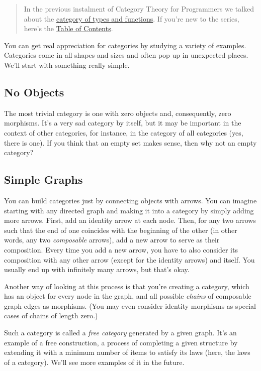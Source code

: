 \begin{quote}
In the previous instalment of Category Theory for Programmers we talked
about the
\href{https://bartoszmilewski.com/2014/11/24/types-and-functions/}{category
of types and functions}. If you're new to the series, here's the
\href{https://bartoszmilewski.com/2014/10/28/category-theory-for-programmers-the-preface/}{Table
of Contents}.
\end{quote}

You can get real appreciation for categories by studying a variety of
examples. Categories come in all shapes and sizes and often pop up in
unexpected places. We'll start with something really simple.

\subsection{No Objects}\label{no-objects}

The most trivial category is one with zero objects and, consequently,
zero morphisms. It's a very sad category by itself, but it may be
important in the context of other categories, for instance, in the
category of all categories (yes, there is one). If you think that an
empty set makes sense, then why not an empty category?

\subsection{Simple Graphs}\label{simple-graphs}

You can build categories just by connecting objects with arrows. You can
imagine starting with any directed graph and making it into a category
by simply adding more arrows. First, add an identity arrow at each node.
Then, for any two arrows such that the end of one coincides with the
beginning of the other (in other words, any two \emph{composable}
arrows), add a new arrow to serve as their composition. Every time you
add a new arrow, you have to also consider its composition with any
other arrow (except for the identity arrows) and itself. You usually end
up with infinitely many arrows, but that's okay.

Another way of looking at this process is that you're creating a
category, which has an object for every node in the graph, and all
possible \emph{chains} of composable graph edges as morphisms. (You may
even consider identity morphisms as special cases of chains of length
zero.)

Such a category is called a \emph{free category} generated by a given
graph. It's an example of a free construction, a process of completing a
given structure by extending it with a minimum number of items to
satisfy its laws (here, the laws of a category). We'll see more examples
of it in the future.


